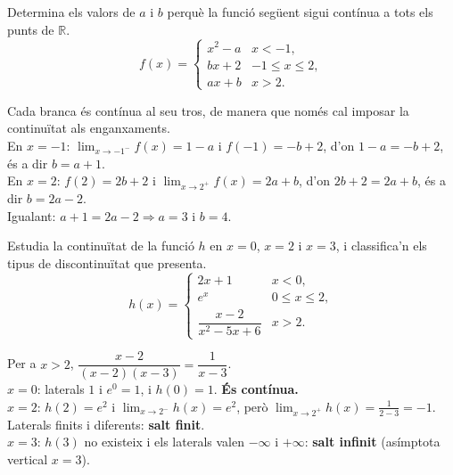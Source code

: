 \begin{apartats}

Determina els valors de $a$ i $b$ perquè la funció següent sigui contínua a tots els
punts de $\mathbb{R}$.
\[
f(x)=\begin{cases}
  x^2-a & \si{x<-1},\\[3pt]
  bx+2  & \si{-1\le x\le 2},\\[3pt]
  ax+b  & \si{x>2}.
\end{cases}
\]

\begin{solucio}
Cada branca és contínua al seu tros, de manera que només cal imposar la continuïtat
als enganxaments.\\
En $x=-1$: $\lim_{x\to-1^-}f(x)=1-a$ i $f(-1)=-b+2$, d'on $1-a=-b+2$, és a dir $b=a+1$.\\
En $x=2$: $f(2)=2b+2$ i $\lim_{x\to2^+}f(x)=2a+b$, d'on $2b+2=2a+b$, és a dir $b=2a-2$.\\
Igualant: $a+1=2a-2\Rightarrow \boxed{a=3}$ i $\boxed{b=4}$.
\end{solucio}

Estudia la continuïtat de la funció $h$ en $x=0$, $x=2$ i $x=3$, i classifica'n els
tipus de discontinuïtat que presenta.
\[
h(x)=\begin{cases}
  2x+1 & \si{x<0},\\[3pt]
  e^{x} & \si{0\le x\le 2},\\[3pt]
  \dfrac{x-2}{x^2-5x+6} & \si{x>2}.
\end{cases}
\]

\begin{solucio}
Per a $x>2$, $\dfrac{x-2}{(x-2)(x-3)}=\dfrac{1}{x-3}$.\\
$x=0$: laterals $1$ i $e^0=1$, i $h(0)=1$. \textbf{És contínua.}\\
$x=2$: $h(2)=e^2$ i $\lim_{x\to2^-}h(x)=e^2$, però $\lim_{x\to2^+}h(x)=\frac{1}{2-3}=-1$.
Laterals finits i diferents: \textbf{salt finit}.\\
$x=3$: $h(3)$ no existeix i els laterals valen $-\infty$ i $+\infty$:
\textbf{salt infinit} (asímptota vertical $x=3$).
\end{solucio}

\end{apartats}
